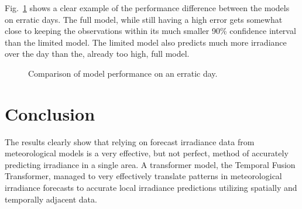 Fig.~\ref{fig:disc_high} shows a clear example of the performance difference between the models on erratic days. The full model, while still having a high error gets somewhat close to keeping the observations within its much smaller 90\% confidence interval than the limited model. The limited model also predicts much more irradiance over the day than the, already too high, full model.
\begin{figure}[ht!]
    \centering
    \qquad
    \qquad
    \caption{Comparison of model performance on an erratic day.
    \label{fig:disc_high}}
\end{figure}


\section{Conclusion\label{sec:conclusions}}
The results clearly show that relying on forecast irradiance data from meteorological models is a very effective, but not perfect, method of accurately predicting irradiance in a single area. A transformer model, the Temporal Fusion Transformer, managed to very effectively translate patterns in meteorological irradiance forecasts to accurate local irradiance predictions utilizing spatially and temporally adjacent data.

